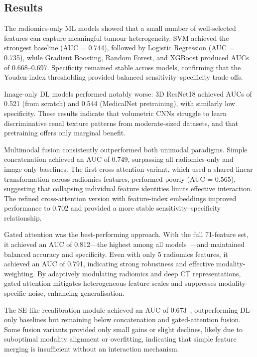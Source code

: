 \subsection{Results}

The radiomics-only ML models showed that a small number of well-selected features can capture meaningful tumour heterogeneity. SVM achieved the strongest baseline (AUC = 0.744), followed by Logistic Regression (AUC = 0.735), while Gradient Boosting, Random Forest, and XGBoost produced AUCs of 0.668–0.697. Specificity remained stable across models, confirming that the Youden-index thresholding provided balanced sensitivity–specificity trade-offs.

Image-only DL models performed notably worse: 3D ResNet18 achieved AUCs of 0.521 (from scratch) and 0.544 (MedicalNet pretraining), with similarly low specificity. These results indicate that volumetric CNNs struggle to learn discriminative renal texture patterns from moderate-sized datasets, and that pretraining offers only marginal benefit.

Multimodal fusion consistently outperformed both unimodal paradigms. Simple concatenation achieved an AUC of 0.749, surpassing all radiomics-only and image-only baselines. The first cross-attention variant, which used a shared linear transformation across radiomics features, performed poorly (AUC = 0.565), suggesting that collapsing individual feature identities limits effective interaction. The refined cross-attention version with feature-index embeddings improved performance to 0.702 and provided a more stable sensitivity–specificity relationship.

Gated attention was the best-performing approach. With the full 71-feature set, it achieved an AUC of 0.812—the highest among all models~\cite{qiu2024gated}—and maintained balanced accuracy and specificity. Even with only 5 radiomics features, it achieved an AUC of 0.791, indicating strong robustness and effective modality-weighting. By adaptively modulating radiomics and deep CT representations, gated attention mitigates heterogeneous feature scales and suppresses modality-specific noise, enhancing generalisation.

The SE-like recalibration module achieved an AUC of 0.673~\cite{hu2018squeeze}, outperforming DL-only baselines but remaining below concatenation and gated-attention fusion. Some fusion variants provided only small gains or slight declines, likely due to suboptimal modality alignment or overfitting, indicating that simple feature merging is insufficient without an interaction mechanism.

